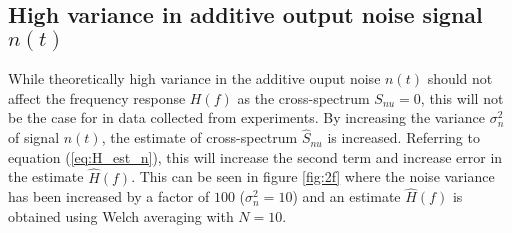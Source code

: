 \documentclass[11pt,a4paper]{article}
\begin{document}
\subsection{High variance in additive output noise signal $n(t)$}
While theoretically high variance in the additive ouput noise $n(t)$ should not
affect the frequency response $H(f)$ as the cross-spectrum $S_{nu} = 0$, this
will not be the case for in data collected from experiments. By increasing the
variance $\sigma_n^2$ of signal $n(t)$, the estimate of cross-spectrum
$\hat{S}_{nu}$ is increased. Referring to equation (\ref{eq:H_est_n}), this
will increase the second term and increase error in the estimate $\hat{H}(f)$.
This can be seen in figure \ref{fig:2f} where the noise variance has been
increased by a factor of $100$ ($\sigma_n^2 = 10$) and an estimate $\hat{H}(f)$
is obtained using Welch averaging with $N = 10$.
\end{document}
